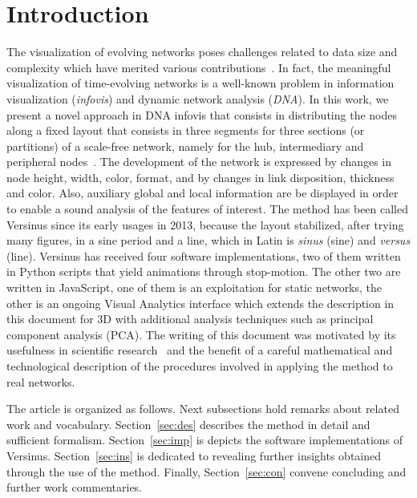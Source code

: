 \documentclass[runningheads]{llncs}
\begin{document}
\section{Introduction}
The visualization of evolving networks poses challenges related to data size and complexity which have merited various contributions~\cite{evo1,evo2,evo3}.
In fact, the meaningful visualization of time-evolving networks is a well-known problem in information visualization (\emph{infovis}) and dynamic network analysis (\emph{DNA}).
In this work, we present a novel approach in DNA infovis that consists in distributing the nodes along a fixed layout that consists in three segments for three sections (or partitions) of a scale-free network, namely for the hub, intermediary and peripheral nodes~\cite{stab}. The development of the network is expressed by changes in node height, width, color, format, and by changes in link disposition, thickness and color. Also, auxiliary global and local information are be displayed in order to enable a sound analysis of the features of interest.
The method has been called Versinus since its early usages in 2013, because the layout stabilized, after trying many figures, in a sine period and a line, which in Latin is \emph{sinus} (sine) and \emph{versus} (line). 
Versinus has received four software implementations, two of them written in Python scripts that yield animations through stop-motion. The other two are written in JavaScript, one of them is an exploitation for static networks, the other is an ongoing Visual Analytics interface which extends the description in this document for 3D with additional analysis techniques such as principal component analysis (PCA).
The writing of this document was motivated by its usefulness in scientific research~\cite{stab,thesis} and the benefit of a careful mathematical and technological description of the procedures involved in applying the method to real networks.

The article is organized as follows. Next subsections hold remarks about related work and vocabulary. Section~\ref{sec:des} describes the method in detail and sufficient formalism. Section~\ref{sec:imp} is depicts the software implementations of Versinus. Section~\ref{sec:ins} is dedicated to revealing further insights obtained through the use of the method. Finally, Section~\ref{sec:con} convene concluding and further work commentaries.
\end{document}
